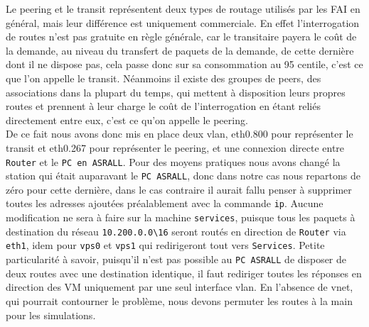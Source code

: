 		Le peering et le transit représentent deux types de routage utilisés par les FAI en général, mais leur différence est uniquement commerciale. En effet l'interrogation de routes n'est pas gratuite en règle générale, car le transitaire payera le coût de la demande, au niveau du transfert de paquets de la demande, de cette dernière dont il ne dispose pas, cela passe donc sur sa consommation au 95 centile, c'est ce que l'on appelle le transit. Néanmoins il existe des groupes de peers, des associations dans la plupart du temps, qui mettent à disposition leurs propres routes et prennent à leur charge le coût de l'interrogation en étant reliés directement entre eux, c'est ce qu'on appelle le peering.\\

		De ce fait nous avons donc mis en place deux vlan, eth0.800 pour représenter le transit et eth0.267 pour représenter le peering, et une connexion directe entre \verb?Router? et le \verb?PC en ASRALL?. Pour des moyens pratiques nous avons changé la station qui était auparavant le \verb?PC ASRALL?, donc dans notre cas nous repartons de zéro pour cette dernière, dans le cas contraire il aurait fallu penser à supprimer toutes les adresses ajoutées préalablement avec la commande \verb?ip?. Aucune modification ne sera à faire sur la machine \verb?services?, puisque tous les paquets à destination du réseau \verb?10.200.0.0\16? seront routés en direction de \verb?Router? via \verb?eth1?, idem pour \verb?vps0? et \verb?vps1? qui redirigeront tout vers \verb?Services?. Petite particularité à savoir, puisqu'il n'est pas possible au \verb?PC ASRALL? de disposer de deux routes avec une destination identique, il faut rediriger toutes les réponses en direction des VM uniquement par une seul interface vlan. En l'absence de vnet, qui pourrait contourner le problème, nous devons permuter les routes à la main pour les simulations.\\

